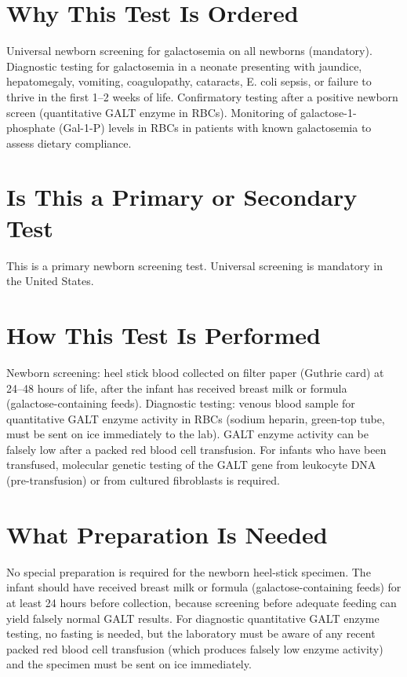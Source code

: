 \section*{Why This Test Is Ordered}
Universal newborn screening for galactosemia on all newborns (mandatory). Diagnostic testing for galactosemia in a neonate presenting with jaundice, hepatomegaly, vomiting, coagulopathy, cataracts, E. coli sepsis, or failure to thrive in the first 1--2 weeks of life. Confirmatory testing after a positive newborn screen (quantitative GALT enzyme in RBCs). Monitoring of galactose-1-phosphate (Gal-1-P) levels in RBCs in patients with known galactosemia to assess dietary compliance.

\section*{Is This a Primary or Secondary Test}
This is a primary newborn screening test. Universal screening is mandatory in the United States.

\section*{How This Test Is Performed}
Newborn screening: heel stick blood collected on filter paper (Guthrie card) at 24--48 hours of life, after the infant has received breast milk or formula (galactose-containing feeds). Diagnostic testing: venous blood sample for quantitative GALT enzyme activity in RBCs (sodium heparin, green-top tube, must be sent on ice immediately to the lab). GALT enzyme activity can be falsely low after a packed red blood cell transfusion. For infants who have been transfused, molecular genetic testing of the GALT gene from leukocyte DNA (pre-transfusion) or from cultured fibroblasts is required.

\section*{What Preparation Is Needed}
No special preparation is required for the newborn heel-stick specimen. The infant should have received breast milk or formula (galactose-containing feeds) for at least 24 hours before collection, because screening before adequate feeding can yield falsely normal GALT results. For diagnostic quantitative GALT enzyme testing, no fasting is needed, but the laboratory must be aware of any recent packed red blood cell transfusion (which produces falsely low enzyme activity) and the specimen must be sent on ice immediately.

